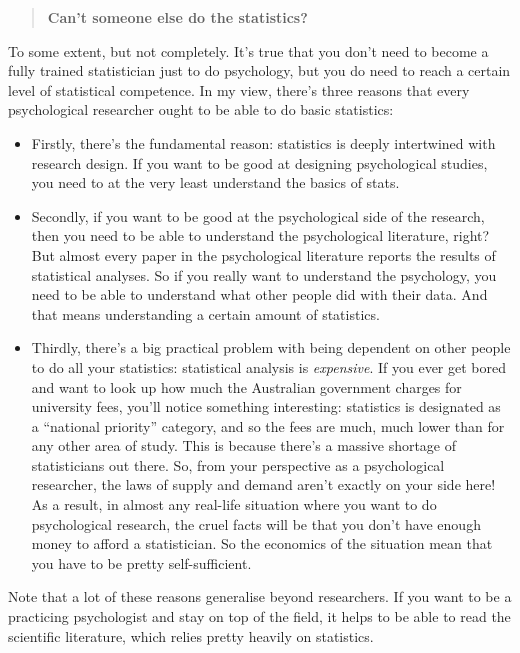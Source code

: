 \documentclass[
  a4paper,
]{book}
\providecommand{\tightlist}{%
  \setlength{\itemsep}{0pt}\setlength{\parskip}{0pt}}\usepackage{longtable,booktabs,array}
\begin{document}
\begin{quote}
\textbf{Can't someone else do the statistics?}
\end{quote}

To some extent, but not completely. It's true that you don't need to
become a fully trained statistician just to do psychology, but you do
need to reach a certain level of statistical competence. In my view,
there's three reasons that every psychological researcher ought to be
able to do basic statistics:

\begin{itemize}
\tightlist
\item
  Firstly, there's the fundamental reason: statistics is deeply
  intertwined with research design. If you want to be good at designing
  psychological studies, you need to at the very least understand the
  basics of stats.
\item
  Secondly, if you want to be good at the psychological side of the
  research, then you need to be able to understand the psychological
  literature, right? But almost every paper in the psychological
  literature reports the results of statistical analyses. So if you
  really want to understand the psychology, you need to be able to
  understand what other people did with their data. And that means
  understanding a certain amount of statistics.
\item
  Thirdly, there's a big practical problem with being dependent on other
  people to do all your statistics: statistical analysis is
  \emph{expensive}. If you ever get bored and want to look up how much
  the Australian government charges for university fees, you'll notice
  something interesting: statistics is designated as a ``national
  priority'' category, and so the fees are much, much lower than for any
  other area of study. This is because there's a massive shortage of
  statisticians out there. So, from your perspective as a psychological
  researcher, the laws of supply and demand aren't exactly on your side
  here! As a result, in almost any real-life situation where you want to
  do psychological research, the cruel facts will be that you don't have
  enough money to afford a statistician. So the economics of the
  situation mean that you have to be pretty self-sufficient.
\end{itemize}

Note that a lot of these reasons generalise beyond researchers. If you
want to be a practicing psychologist and stay on top of the field, it
helps to be able to read the scientific literature, which relies pretty
heavily on statistics.
\end{document}
